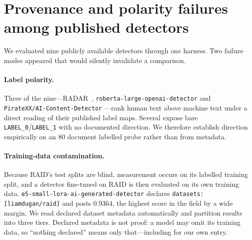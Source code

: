 \documentclass[11pt]{article}
\begin{document}
\section{Provenance and polarity failures among published detectors}
\label{sec:leaderboard}

We evaluated nine publicly available detectors through one harness. Two failure
modes appeared that would silently invalidate a comparison.

\paragraph{Label polarity.} Three of the nine---RADAR~\cite{radar},
\texttt{roberta-large-openai-detector} and \texttt{PirateXX/AI-Content-Detector}
---rank human text above machine text under a direct reading of their published
label maps. Several expose bare \texttt{LABEL\_0}/\texttt{LABEL\_1} with no
documented direction. We therefore establish direction empirically on an 80
document labelled probe rather than from metadata.

\paragraph{Training-data contamination.} Because RAID's test splits are blind,
measurement occurs on its labelled training split, and a detector fine-tuned on
RAID is then evaluated on its own training data.
\texttt{e5-small-lora-ai-generated-detector} declares
\texttt{datasets: [liamdugan/raid]} and posts 0.9364, the highest score in the
field by a wide margin. We read declared dataset metadata automatically and
partition results into three tiers. Declared metadata is not proof: a model may
omit its training data, so ``nothing declared'' means only that---including for
our own entry.
\end{document}
